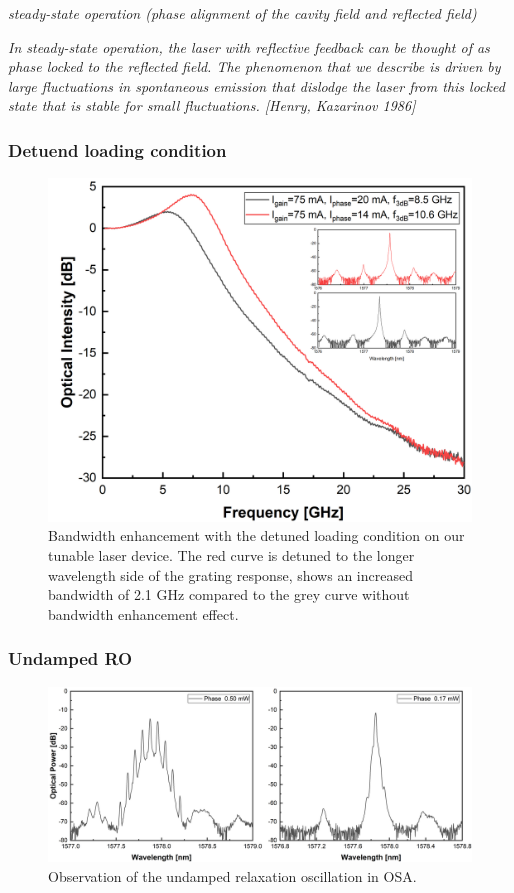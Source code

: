 \textit{steady-state operation (phase alignment of the cavity field and reflected field)}

\textit{In steady-state operation, the laser with reflective feedback can be thought of as phase locked to the reflected field. The phenomenon that we describe is driven by large fluctuations in spontaneous emission that dislodge the laser from this locked state that is stable for small fluctuations. [Henry, Kazarinov 1986]}

\subsubsection{Detuend loading condition}
\begin{figure}[!htb]
    \centering
    \includegraphics[width=.6\linewidth]{figures/detuned_loading.png}
    \caption{Bandwidth enhancement with the detuned loading condition on our tunable laser device. The red curve is detuned to the longer wavelength side of the grating response, shows an increased bandwidth of 2.1 GHz compared to the grey curve without bandwidth enhancement effect.}
    \label{fig:detuned_loading}
\end{figure}

\subsubsection{Undamped RO}
\begin{figure}[!htb]
    \centering
    \includegraphics[width=.9\linewidth]{figures/Undamped_RO_grating_4621.png}
    \caption{Observation of the undamped relaxation oscillation in OSA.}
    \label{fig:undamped_RO}
\end{figure}

